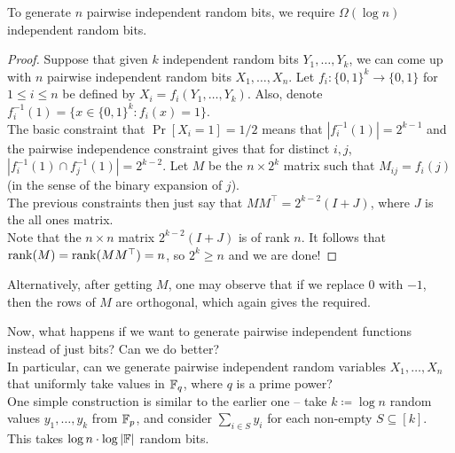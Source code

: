 			\begin{fprop}
				\label{ind random bits using pairwise ind random bits}
				To generate $n$ pairwise independent random bits, we require $\Omega(\log n)$ independent random bits.
			\end{fprop}
			\begin{proof}
				Suppose that given $k$ independent random bits $Y_1,\ldots,Y_k$, we can come up with $n$ pairwise independent random bits $X_1,\ldots,X_n$. Let $f_i : \{0,1\}^k \to \{0,1\}$ for $1 \le i \le n$ be defined by $X_i = f_i(Y_1,\ldots,Y_k)$. Also, denote $f_i^{-1}(1) = \{ x \in \{0,1\}^k : f_i(x) = 1 \}$.\\
				The basic constraint that $\Pr[X_i = 1] = 1/2$ means that $|f_i^{-1}(1)| = 2^{k-1}$ and the pairwise independence constraint gives that for distinct $i,j$, $|f_i^{-1}(1) \cap f_j^{-1}(1)| = 2^{k-2}$. Let $M$ be the $n \times 2^k$ matrix such that $M_{ij} = f_i(j)$ (in the sense of the binary expansion of $j$).\\
				The previous constraints then just say that $M M^\top = 2^{k-2} (I+J)$, where $J$ is the all ones matrix.\\
				Note that the $n \times n$ matrix $2^{k-2}(I+J)$ is of rank $n$. It follows that $\operatorname{rank}(M) = \operatorname{rank}(MM^\top) = n$, so $2^k \ge n$ and we are done!
			\end{proof}

			Alternatively, after getting $M$, one may observe that if we replace $0$ with $-1$, then the rows of $M$ are orthogonal, which again gives the required.



			Now, what happens if we want to generate pairwise independent functions instead of just bits? Can we do better?\\
			In particular, can we generate pairwise independent random variables $X_1,\ldots,X_n$ that uniformly take values in $\mathbb{F}_q$, where $q$ is a prime power?\\

			One simple construction is similar to the earlier one -- take $k \coloneqq \log n$ random values $y_1,\ldots,y_k$ from $\mathbb{F}_p$, and consider $\sum_{i \in S} y_i$ for each non-empty $S \subseteq [k]$. This takes $\log n \cdot \log |\mathbb{F}|$ random bits. \\

